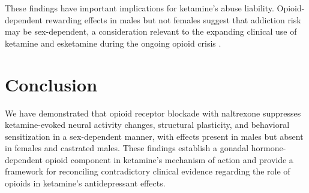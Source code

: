 \documentclass[11pt]{article}
\begin{document}
These findings have important implications for ketamine's abuse liability. Opioid-dependent rewarding effects in males but not females suggest that addiction risk may be sex-dependent, a consideration relevant to the expanding clinical use of ketamine and esketamine during the ongoing opioid crisis \citep{schak2016}.

\section{Conclusion}

We have demonstrated that opioid receptor blockade with naltrexone suppresses ketamine-evoked neural activity changes, structural plasticity, and behavioral sensitization in a sex-dependent manner, with effects present in males but absent in females and castrated males. These findings establish a gonadal hormone-dependent opioid component in ketamine's mechanism of action and provide a framework for reconciling contradictory clinical evidence regarding the role of opioids in ketamine's antidepressant effects.



\end{document}
